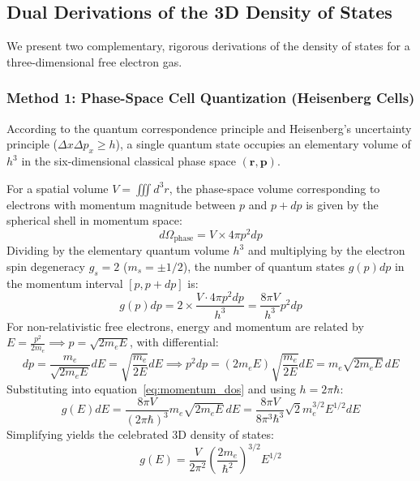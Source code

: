 \documentclass[11pt,a4paper]{article}
\newcommand{\vb}[1]{\mathbf{#1}}
\begin{document}
\subsection{Dual Derivations of the 3D Density of States}
We present two complementary, rigorous derivations of the density of states for a three-dimensional free electron gas.

\subsubsection{Method 1: Phase-Space Cell Quantization (Heisenberg Cells)}
According to the quantum correspondence principle and Heisenberg's uncertainty principle ($\Delta x \Delta p_x \ge h$), a single quantum state occupies an elementary volume of $h^3$ in the six-dimensional classical phase space $(\vb{r}, \vb{p})$.

For a spatial volume $V = \iiint d^3r$, the phase-space volume corresponding to electrons with momentum magnitude between $p$ and $p+dp$ is given by the spherical shell in momentum space:
\begin{equation}
d\Omega_{\mathrm{phase}} = V \times 4\pi p^2 dp
\end{equation}
Dividing by the elementary quantum volume $h^3$ and multiplying by the electron spin degeneracy $g_s = 2$ ($m_s = \pm 1/2$), the number of quantum states $g(p)dp$ in the momentum interval $[p, p+dp]$ is:
\begin{equation}
g(p)dp = 2 \times \frac{V \cdot 4\pi p^2 dp}{h^3} = \frac{8\pi V}{h^3} p^2 dp
\label{eq:momentum_dos}
\end{equation}
For non-relativistic free electrons, energy and momentum are related by $E = \frac{p^2}{2m_e} \implies p = \sqrt{2m_e E}$, with differential:
\begin{equation}
dp = \frac{m_e}{\sqrt{2m_e E}}dE = \sqrt{\frac{m_e}{2E}}dE \implies p^2 dp = (2m_e E)\sqrt{\frac{m_e}{2E}}dE = m_e\sqrt{2m_e E}\,dE
\end{equation}
Substituting into equation~\eqref{eq:momentum_dos} and using $h = 2\pi\hbar$:
\begin{equation}
g(E)dE = \frac{8\pi V}{(2\pi\hbar)^3} m_e \sqrt{2m_e E}\,dE = \frac{8\pi V}{8\pi^3\hbar^3} \sqrt{2} m_e^{3/2} E^{1/2} dE
\end{equation}
Simplifying yields the celebrated 3D density of states:
\begin{equation}
\boxed{g(E) = \frac{V}{2\pi^2}\left(\frac{2m_e}{\hbar^2}\right)^{3/2} E^{1/2}}
\label{eq:3d_dos}
\end{equation}
\end{document}
